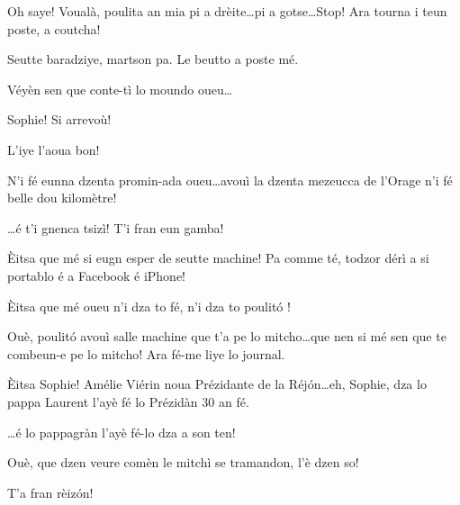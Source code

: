 \begin{drama}

\Maganspeaks Oh saye! Voualà, poulita an mia pi a drèite\ldots pi a gotse\ldots Stop! Ara tourna i teun poste, a coutcha!


\Maganspeaks Seutte baradziye, martson pa. Le beutto a poste mé.


\Maganspeaks{} Véyèn sen que conte-tì lo moundo oueu\ldots


\Paganspeaks Sophie! Si arrevoù!

\Maganspeaks L'iye l’aoua bon!

\Paganspeaks {} N'i fé eunna dzenta promin-ada oueu\ldots avouì la dzenta mezeucca de l’Orage n'i fé belle dou kilomètre!

\Maganspeaks \ldots é t'i gnenca tsizì! T'i fran eun gamba!


\Paganspeaks \`Eitsa que mé si eugn esper de seutte machine! Pa comme té, todzor dérì a si portablo é a Facebook é iPhone!

\Maganspeaks \`Eitsa que mé oueu n'i dza to fé, n'i dza to poulit\'o !


\Paganspeaks Ouè, poulit\'o avouì salle machine que t'a pe lo mitcho\ldots que nen si mé sen que te combeun-e pe lo mitcho!  Ara fé-me liye lo journal.

\Paganspeaks \`Eitsa Sophie! Amélie Viérin noua Prézidante de la Réj\'on\ldots eh, Sophie, dza lo pappa Laurent l'ayè fé lo Prézidàn 30 an fé.

\Maganspeaks \ldots é lo pappagràn l'ayè fé-lo dza a son ten!

\Paganspeaks Ouè, que dzen veure comèn le mitchì se tramandon, l'è dzen so!

\Maganspeaks T'a fran rèiz\'on!



\end{drama}

